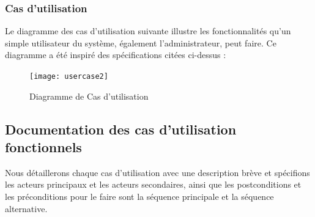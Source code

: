  \subsubsection{ Cas d’utilisation }

Le diagramme des cas d’utilisation suivante illustre les fonctionnalités qu’un simple utilisateur du système, également l’administrateur, peut faire. Ce diagramme a été inspiré des spécifications citées ci-dessus :
 
 \begin{figure}[H]
 	\centering
 	\texttt{[image: usercase2]}
 	\caption{Diagramme de Cas d’utilisation}
 	\label{fig:usercase}
 \end{figure}
 
 \subsection{ Documentation des cas d’utilisation fonctionnels }
Nous détaillerons chaque cas d'utilisation avec une description brève et spécifions les acteurs principaux et les acteurs secondaires, ainsi que les postconditions et les préconditions pour le faire sont la séquence principale et la séquence alternative.

